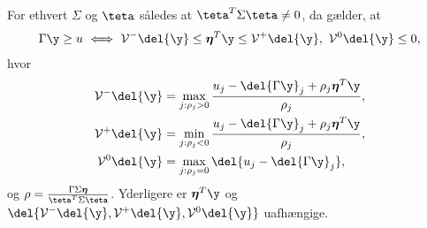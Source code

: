 %
\begin{lem} \label{lem:polyhedral}
For ethvert \(\Sigma\) og \(\teta\) således at \(\teta^T \Sigma \teta \neq 0\), da gælder, at
\begin{align}
\Gamma \y \geq u \ \Longleftrightarrow \ \mathcal{V}^- \del{\y} \leq \boldsymbol{\eta}^T \y \leq \mathcal{V}^+ \del{\y}, \  \mathcal{V}^0 \del{\y} \leq 0, \label{eq:post_8}
\end{align}
hvor
\begin{align}
\mathcal{V}^- \del{\y} &= \max_{j: \rho_j > 0} \frac{u_j - \del{\Gamma \y}_j + \rho_j \boldsymbol{\eta}^T \y}{\rho_j}, \label{eq:V-} \\
\mathcal{V}^+ \del{\y} &= \min_{j: \rho_j < 0} \frac{u_j - \del{\Gamma \y}_j + \rho_j \boldsymbol{\eta}^T \y}{\rho_j}, \label{eq:V+} \\
\mathcal{V}^0 \del{\y} &= \max_{j: \rho_j = 0} \del{u_j - \del{\Gamma \y}_j}, \label{eq:V0} 
\end{align}
og \(\rho=\frac{\Gamma \Sigma \boldsymbol{\eta}}{\teta^T \Sigma \teta}\).
Yderligere  er \(\boldsymbol{\eta}^T \y\) og \(\del{\mathcal{V}^-\del{\y}, \mathcal{V}^+\del{\y},\mathcal{V}^0\del{\y}}\) uafhængige. 
\end{lem}
